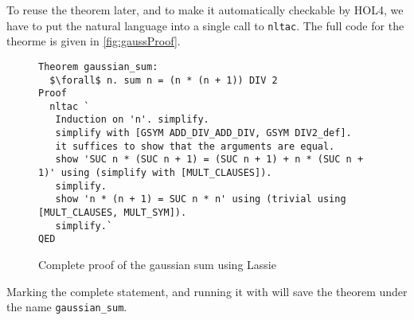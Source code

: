 To reuse the theorem later, and to make it automatically checkable by HOL4, we
have to put the natural language into a single call to \lstinline{nltac}.
The full code for the theorme is given in \autoref{fig:gaussProof}.
%
\begin{figure}[t]
\begin{lstlisting}[mathescape=true]
Theorem gaussian_sum:
  $\forall$ n. sum n = (n * (n + 1)) DIV 2
Proof
  nltac `
   Induction on 'n'. simplify.
   simplify with [GSYM ADD_DIV_ADD_DIV, GSYM DIV2_def].
   it suffices to show that the arguments are equal.
   show 'SUC n * (SUC n + 1) = (SUC n + 1) + n * (SUC n + 1)' using (simplify with [MULT_CLAUSES]).
   simplify.
   show 'n * (n + 1) = SUC n * n' using (trivial using [MULT_CLAUSES, MULT_SYM]).
   simplify.`
QED
\end{lstlisting}
\caption{Complete proof of the gaussian sum using Lassie}\label{fig:gaussProof}
\end{figure}

Marking the complete statement, and running it with  will save the
theorem under the name \lstinline{gaussian_sum}.
